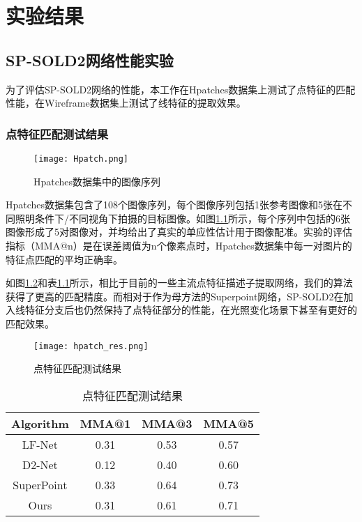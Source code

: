 
\chapter{实验结果}
\section{SP-SOLD2网络性能实验}
为了评估SP-SOLD2网络的性能，本工作在Hpatches\cite{balntas2017hpatches}数据集上测试了点特征的匹配性能，在Wireframe\cite{huang2018learning}数据集上测试了线特征的提取效果。
\subsection{点特征匹配测试结果}
\begin{figure}
  \centering
  \texttt{[image: Hpatch.png]}
  \label{fig_hpatch}
  \caption{Hpatches数据集中的图像序列}
\end{figure}

Hpatches数据集包含了108个图像序列，每个图像序列包括1张参考图像和5张在不同照明条件下/不同视角下拍摄的目标图像。如图\ref{fig_hpatch}所示，每个序列中包括的6张图像形成了5对图像对，并均给出了真实的单应性估计用于图像配准。实验的评估指标（MMA@n）是在误差阈值为n个像素点时，Hpatches数据集中每一对图片的特征点匹配的平均正确率。

如图\ref{fig_hpatch_res}和表\ref{tab_hpatch_res}所示，相比于目前的一些主流点特征描述子提取网络，我们的算法获得了更高的匹配精度。而相对于作为母方法的Superpoint网络，SP-SOLD2在加入线特征分支后也仍然保持了点特征部分的性能，在光照变化场景下甚至有更好的匹配效果。
\begin{figure}
  \centering
  \texttt{[image: hpatch\_res.png]}
  \caption{点特征匹配测试结果}
  \label{fig_hpatch_res}
\end{figure}
\begin{table}[!ht]
  \centering
  \begin{tabular}{|c|c|c|c|}
  \hline
      Algorithm & MMA@1 & MMA@3 & MMA@5 \\ \hline
      LF-Net & 0.31 & 0.53 & 0.57 \\ \hline
      D2-Net & 0.12 & 0.40 & 0.60 \\ \hline
      SuperPoint & 0.33 & 0.64 & 0.73 \\ \hline
      Ours & 0.31 & 0.61 & 0.71 \\ \hline
  \end{tabular}
  \caption{点特征匹配测试结果}
  \label{tab_hpatch_res}
\end{table}

